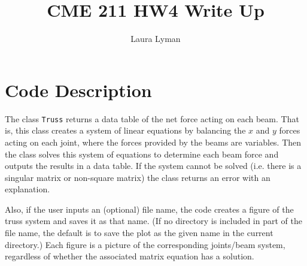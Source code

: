 \documentclass[11pt]{amsart}
\theoremstyle{definition}
\begin{document}
\title{CME 211 HW4 Write Up}
\author{Laura Lyman}

\maketitle
\vspace{-20pt}
\tableofcontents
\section{Code Description} The class \texttt{Truss} returns a data table of the net force acting on each beam. That is, this class creates a system of linear equations by balancing the $x$ and $y$ forces acting on each joint, where the forces provided
by the beams are variables. Then the class solves this system of equations to determine each beam force and outputs the results in a data table. If the system cannot be solved (i.e. there is a singular matrix or non-square matrix) the class returns an error with an explanation.

Also, if the user inputs an (optional) file name, the code creates a figure of the truss system and saves it as that name. (If no directory is included in part of the file name, the default is to save the plot as the given name in the current directory.) Each figure is a picture of the corresponding joints/beam system, regardless of whether the associated matrix equation has a solution.
\end{document}

